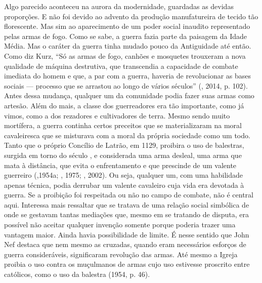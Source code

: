 Algo parecido aconteceu na aurora da modernidade, guardadas as devidas
proporções. E não foi devido ao advento da produção manufatureira de
tecido tão florescente. Mas sim ao aparecimento de um poder social
inaudito representado pelas armas de fogo. Como se sabe, a guerra fazia
parte da paisagem da Idade Média. Mas o caráter da guerra tinha mudado
pouco da Antiguidade até então. Como diz Kurz, ``Só as armas de fogo,
canhões e mosquetes trouxeram a nova qualidade de máquina destrutiva,
que transcendia a capacidade de combate imediata do homem e que, a par
com a guerra, haveria de revolucionar as bases sociais --- processo que
se arrastou ao longo de vários séculos'' (, 2014, p. 102). Antes
dessa mudança, qualquer um da comunidade podia fazer suas armas como
artesão. Além do mais, a classe dos guerreadores era tão importante,
como já vimos, como a dos rezadores e cultivadores de terra. Mesmo sendo
muito mortífera, a guerra continha certos preceitos que se
materializaram na moral cavaleiresca que se misturava com a moral da
própria sociedade como um todo. Tanto que o próprio Concílio de Latrão,
em 1129, proibira o uso de balestras, surgida em torno do século , e
considerada uma arma desleal, uma arma que mata à distância, que evita o
enfrentamento e que prescinde de um valente guerreiro (,1954a;
, 1975; , 2002). Ou seja, qualquer um, com uma habilidade
apenas técnica, podia derrubar um valente cavaleiro cuja vida era
devotada à guerra. Se a proibição foi respeitada ou não no campo de
combate, não é central aqui. Interessa mais ressaltar que se tratava
de uma relação social simbólica de onde se gestavam tantas mediações
que, mesmo em se tratando de disputa, era possível não aceitar qualquer
invenção somente porque poderia trazer uma vantagem maior. Ainda havia
possibilidade de limite. É nesse sentido que John Nef destaca que nem
mesmo as cruzadas, quando eram necessários esforços de guerra
consideráveis, significaram revolução das armas. Até mesmo a Igreja
proibia o uso contra os muçulmanos de armas cujo uso estivesse proscrito
entre católicos, como o uso da balestra (1954, p. 46).

